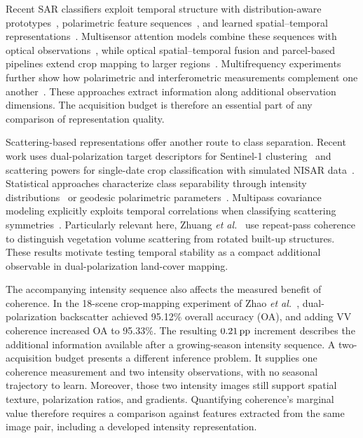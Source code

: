 Recent SAR classifiers exploit temporal structure with distribution-aware prototypes~\cite{Guo2025}, polarimetric feature sequences~\cite{LiuN2025}, and learned spatial--temporal representations~\cite{Russo2025,He2025}. Multisensor attention models combine these sequences with optical observations~\cite{Anandakrishnan2025}, while optical spatial--temporal fusion and parcel-based pipelines extend crop mapping to larger regions~\cite{Li2026,Sanchez2026}. Multifrequency experiments further show how polarimetric and interferometric measurements complement one another~\cite{Romero2026}. These approaches extract information along additional observation dimensions. The acquisition budget is therefore an essential part of any comparison of representation quality.

Scattering-based representations offer another route to class separation. Recent work uses dual-polarization target descriptors for Sentinel-1 clustering~\cite{Verma2025} and scattering powers for single-date crop classification with simulated NISAR data~\cite{Nihar2026}. Statistical approaches characterize class separability through intensity distributions~\cite{Negri2025} or geodesic polarimetric parameters~\cite{daSilva2026}. Multipass covariance modeling explicitly exploits temporal correlations when classifying scattering symmetries~\cite{Hanis2025}. Particularly relevant here, Zhuang \textit{et al.}~\cite{Zhuang2024} use repeat-pass coherence to distinguish vegetation volume scattering from rotated built-up structures. These results motivate testing temporal stability as a compact additional observable in dual-polarization land-cover mapping.

The accompanying intensity sequence also affects the measured benefit of coherence. In the 18-scene crop-mapping experiment of Zhao \textit{et al.}~\cite{Zhao2024}, dual-polarization backscatter achieved 95.12\% overall accuracy (OA), and adding VV coherence increased OA to 95.33\%. The resulting $0.21\,\mathrm{pp}$ increment describes the additional information available after a growing-season intensity sequence. A two-acquisition budget presents a different inference problem. It supplies one coherence measurement and two intensity observations, with no seasonal trajectory to learn. Moreover, those two intensity images still support spatial texture, polarization ratios, and gradients. Quantifying coherence's marginal value therefore requires a comparison against features extracted from the same image pair, including a developed intensity representation.


